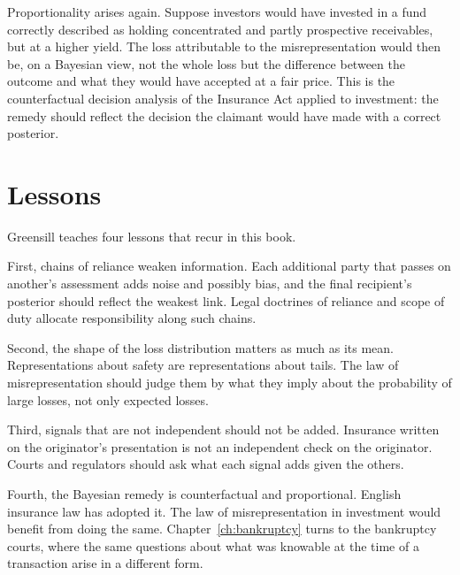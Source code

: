 Proportionality arises again. Suppose investors would have invested in a fund correctly described as holding concentrated and partly prospective receivables, but at a higher yield. The loss attributable to the misrepresentation would then be, on a Bayesian view, not the whole loss but the difference between the outcome and what they would have accepted at a fair price. This is the counterfactual decision analysis of the Insurance Act applied to investment: the remedy should reflect the decision the claimant would have made with a correct posterior.

\section{Lessons}

Greensill teaches four lessons that recur in this book.

First, chains of reliance weaken information. Each additional party that passes on another's assessment adds noise and possibly bias, and the final recipient's posterior should reflect the weakest link. Legal doctrines of reliance and scope of duty allocate responsibility along such chains.

Second, the shape of the loss distribution matters as much as its mean. Representations about safety are representations about tails. The law of misrepresentation should judge them by what they imply about the probability of large losses, not only expected losses.

Third, signals that are not independent should not be added. Insurance written on the originator's presentation is not an independent check on the originator. Courts and regulators should ask what each signal adds given the others.

Fourth, the Bayesian remedy is counterfactual and proportional. English insurance law has adopted it. The law of misrepresentation in investment would benefit from doing the same. Chapter~\ref{ch:bankruptcy} turns to the bankruptcy courts, where the same questions about what was knowable at the time of a transaction arise in a different form.

